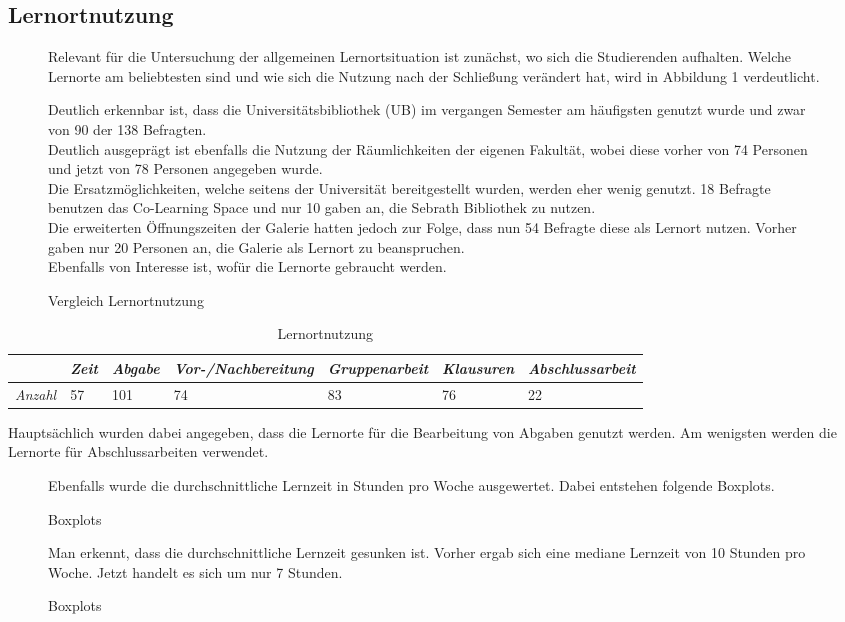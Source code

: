 \documentclass[11pt, a4paper]{article}
\begin{document}
\subsection{Lernortnutzung}
\begin{figure}[h]
Relevant für die Untersuchung der allgemeinen Lernortsituation ist zunächst, wo sich die Studierenden aufhalten. Welche Lernorte am beliebtesten sind und wie sich die Nutzung nach der Schließung verändert hat, wird in Abbildung 1 verdeutlicht.

 
 \caption{Vergleich Lernortnutzung}
\leavevmode

Deutlich erkennbar ist, dass die Universitätsbibliothek (UB) im vergangen Semester am häufigsten genutzt wurde und zwar von 90 der 138 Befragten.\\
Deutlich ausgeprägt ist ebenfalls die Nutzung der Räumlichkeiten der eigenen Fakultät, wobei diese vorher von 74 Personen und jetzt von 78 Personen angegeben wurde. \\
Die Ersatzmöglichkeiten, welche seitens der Universität bereitgestellt wurden, werden eher wenig genutzt. 18 Befragte benutzen das Co-Learning Space und nur 10 gaben an, die Sebrath Bibliothek zu nutzen.\\
Die erweiterten Öffnungszeiten der Galerie hatten jedoch zur Folge, dass nun 54 Befragte diese als Lernort nutzen. Vorher gaben nur 20 Personen an, die Galerie als Lernort zu beanspruchen.\\


Ebenfalls von Interesse ist, wofür die Lernorte gebraucht werden. 

\end{figure}
\begin{table}[h]
	\begin{tabular}{l|llllll}
		& \textit{Zeit} & \textit{Abgabe} & \textit{Vor-/Nachbereitung} & \textit{Gruppenarbeit} & \textit{Klausuren} & \textit{Abschlussarbeit} \\ \hline
		\textit{Anzahl} & 57            & 101             & 74                          & 83                     & 76                 & 22                      
	\end{tabular}
		\caption{Lernortnutzung}
\end{table}

Hauptsächlich wurden dabei angegeben, dass die Lernorte für die Bearbeitung von Abgaben genutzt werden. Am wenigsten werden die Lernorte für Abschlussarbeiten verwendet.
\leavevmode

\begin{figure}[htp]
	Ebenfalls wurde die durchschnittliche Lernzeit in Stunden pro Woche ausgewertet. Dabei entstehen folgende Boxplots.\\
	\vspace{-1.5cm}
	{\centering} 
	\vspace{0cm}
	\caption{Boxplots}
	\vspace{0.8cm}
	Man erkennt, dass die durchschnittliche Lernzeit gesunken ist. Vorher ergab sich eine mediane Lernzeit von 10 Stunden pro Woche. Jetzt handelt es sich um nur 7 Stunden.
	{\centering }
	\vspace{-2cm}
	\caption{Boxplots}
\end{figure}
\end{document}
